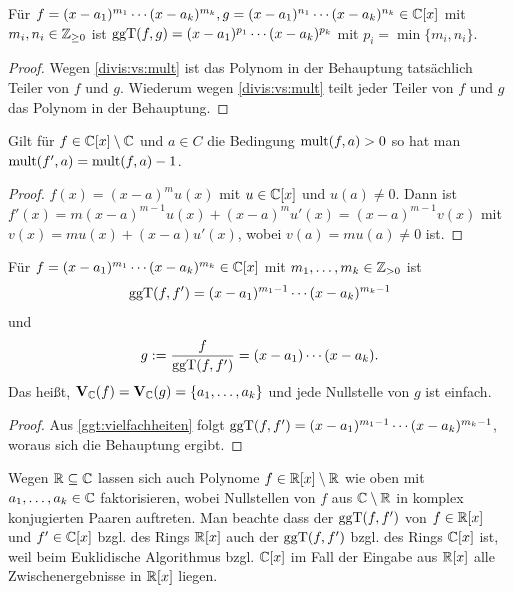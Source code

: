 \documentclass[11pt]{article}
\numberwithin{equation}{section}
\begin{document}
\begin{corollary} \label{ggt:vielfachheiten}
	Für $f = (x-a_1)^{m_1} \cdots (x-a_k)^{m_k}, g = (x-a_1)^{n_1}\cdots (x-a_k)^{n_k} \in \mathbb{C}[x]$ mit $m_i,n_i \in \mathbb{Z}_{\ge 0}$ ist $\operatorname{ggT}(f,g) = (x-a_1)^{p_1} \cdots (x-a_k)^{p_k}$ mit $p_i = \min \{m_i,n_i\}$. 
\end{corollary} 
\begin{proof} 
	Wegen \eqref{divis:vs:mult} ist das Polynom in der Behauptung tatsächlich Teiler von $f$ und $g$. Wiederum wegen \eqref{divis:vs:mult} teilt jeder Teiler von $f$ und $g$ das Polynom in der Behauptung. 
\end{proof} 

\begin{proposition} 
	Gilt für $f \in \mathbb{C}[x] \setminus \mathbb{C}$ und $a \in C$ die Bedingung $\operatorname{mult}(f,a)>0$ so hat man $\operatorname{mult}(f',a)  = \operatorname{mult}(f,a) -1$. 
\end{proposition} 
\begin{proof}
	$f(x) = (x-a)^m u(x)$ mit $u \in \mathbb{C}[x]$ und $u(a)  \ne 0$. Dann ist $f'(x) = m (x-a)^{m-1} u(x) + (x-a)^m u'(x) = (x-a)^{m-1} v(x)$ mit $v(x) = m u(x) + (x-a) u'(x)$, wobei $v(a) = m u(a) \ne 0$ ist. 
\end{proof} 

\begin{corollary} \label{ggT:f:f'} 
	Für $f = (x-a_1)^{m_1} \cdots (x-a_k)^{m_k} \in \mathbb{C}[x]$ mit $m_1,\ldots,m_k \in \mathbb{Z}_{>0}$ ist 
	\[
		\operatorname{ggT}(f,f') = (x-a_1)^{m_1-1} \cdots (x-a_k)^{m_k-1} 
	\]
	und 
	\[
		g:= \frac{f}{\operatorname{ggT}(f,f')} = (x-a_1) \cdots (x-a_k). 
	\]
	Das heißt, $\mathbf{V}_{\mathbb{C}}(f) = \mathbf{V}_{\mathbb{C}}(g) = \{a_1,\ldots,a_k\}$ und jede Nullstelle von $g$ ist einfach. 
\end{corollary} 
\begin{proof} 
	Aus \ref{ggt:vielfachheiten} folgt $\operatorname{ggT}(f,f') = (x-a_1)^{m_1-1} \cdots (x-a_k)^{m_k-1}$, woraus sich die Behauptung ergibt. 
\end{proof} 

\begin{remark} 
		Wegen $\mathbb{R} \subseteq \mathbb{C}$ lassen sich auch Polynome  $f \in \mathbb{R}[x] \setminus \mathbb{R}$ wie oben mit $a_1,\ldots,a_k \in \mathbb{C}$ faktorisieren, wobei Nullstellen von $f$ aus $\mathbb{C} \setminus \mathbb{R}$ in komplex konjugierten Paaren auftreten. Man beachte dass der $\operatorname{ggT}(f,f')$ von $f \in \mathbb{R}[x]$ und $f' \in \mathbb{C}[x]$ bzgl. des Rings $\mathbb{R}[x]$ auch der $\operatorname{ggT}(f,f')$ bzgl. des Rings $\mathbb{C}[x]$ ist, weil beim Euklidische Algorithmus bzgl. $\mathbb{C}[x]$ im Fall der Eingabe aus $\mathbb{R}[x]$ alle Zwischenergebnisse in  $\mathbb{R}[x]$ liegen. 
\end{remark} 
\end{document}
